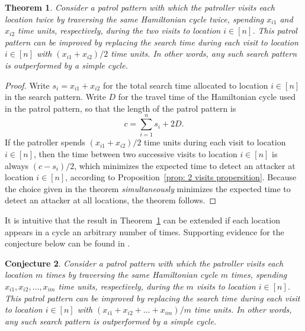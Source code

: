 \documentclass[11pt,a4paper]{article}
\newtheorem{theorem}{Theorem}[section]
\newtheorem{conj}[theorem]{Conjecture}
\newcommand{\new}[1]{{\color{black}#1}}
\newcommand{\kyle}[1]{{\color{orange}#1}}
\begin{document}
\begin{theorem} \label{th: simple cycle two visits}
Consider a patrol pattern with which the patroller visits each location twice by traversing the same Hamiltonian cycle twice, spending $x_{i1}$ and $x_{i2}$ time units, respectively, during the two visits to location $i \in [n]$.
This patrol pattern can be improved by replacing the search time during each visit to location $i \in [n]$ with $(x_{i1} + x_{i2})/2$ time units.
In other words, any such search pattern is outperformed by a simple cycle.
\end{theorem}
\begin{proof}
Write $s_i = x_{i1} + x_{i2}$ for the total search time allocated to location $i \in [n]$ in the search pattern.
Write $D$ for the travel time of the Hamiltonian cycle used in the patrol pattern, so that the length of the patrol pattern is
\[
c = \sum_{i=1}^n s_i + 2D.
\]
If the patroller spends $(x_{i1} + x_{i2})/2$ time units during each visit to location $i \in [n]$, then the time between two successive visits to location $i \in [n]$ is always $(c-s_i)/2$, which minimizes the expected time to detect an attacker at location $i \in [n]$, according to Proposition~\ref{prop: 2 visits propersition}.
Because the choice given in the theorem \textit{simultaneously} minimizes the expected time to detect an attacker at all locations, the theorem follows.
\end{proof}


It is intuitive that the result in Theorem~\ref{th: simple cycle two visits} can be extended if each location appears in a cycle an arbitrary number of times. Supporting evidence for the conjecture below can be found in \cite{mellor2024}.

\begin{conj} \label{conj: multiple visits}
Consider a patrol pattern with which the patroller visits each location $m$ times by traversing the same Hamiltonian cycle $m$ times, spending $x_{i1},x_{i2},\hdots,x_{im}$ time units, respectively, during the $m$ visits to location $i \in [n]$.
This patrol pattern can be improved by replacing the search time during each visit to location $i \in [n]$ with $(x_{i1} + x_{i2} + \hdots + x_{im})/m$ time units.
In other words, any such search pattern is outperformed by a simple cycle.
\end{conj}
\end{document}
